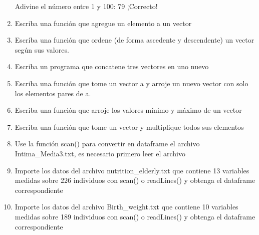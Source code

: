 \documentclass[11pt]{article} %
\begin{document}
\begin{enumerate}
Adivine el número entre 1 y 100: 79 ¡Correcto!\par
\item Escriba una función que agregue un elemento a un vector\par
\item Escríba una función que ordene (de forma ascedente y descendente) un vector según sus valores.\par
\item Escriba un programa que concatene tres vectores en uno nuevo\par
\item Escriba una función que tome un vector a y arroje un nuevo vector con solo los elementos pares de a.\par
\item Escriba una función que arroje los valores mínimo y máximo de un vector \par
\item Escriba una función que tome un vector y multiplique todos sus elementos\par
\item Use la función scan() para convertir en dataframe el archivo Intima\_Media3.txt, es necesario primero leer el archivo
\item Importe los datos del archivo nutrition\_elderly.txt que contiene 13 variables medidas sobre 226 individuos con scan() o readLines() y obtenga el dataframe correspondiente
\item Importe los datos del archivo Birth\_weight.txt que contiene 10 variables medidas sobre 189 individuos con scan() o readLines() y obtenga el dataframe correspondiente
\end{enumerate}
\end{document}
